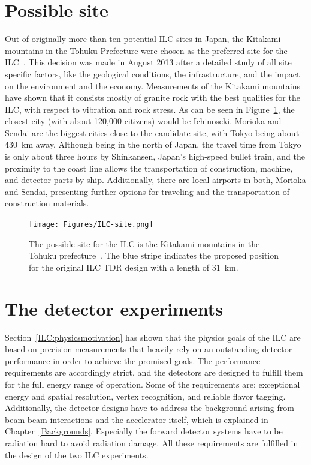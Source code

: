 \section{Possible site}
Out of originally more than ten potential ILC sites in Japan, the Kitakami mountains in the Tohuku Prefecture were chosen as the preferred site for the ILC~\cite{Site}.
This decision was made in August 2013 after a detailed study of all site specific factors, like the geological conditions, the infrastructure, and the impact on the environment and the economy.
Measurements of the Kitakami mountains have shown that it consists mostly of granite rock with the best qualities for the ILC, with respect to vibration and rock stress.
As can be seen in Figure~\ref{fig:ILC_Site}, the closest city (with about 120,000 citizens) would be Ichinoseki.
Morioka and Sendai are the biggest cities close to the candidate site, with Tokyo being about \SI{430}{\kilo\meter} away.
Although being in the north of Japan, the travel time from Tokyo is only about three hours by Shinkansen, Japan's high-speed bullet train, and the proximity to the coast line allows the transportation of construction, machine, and detector parts by ship.
Additionally, there are local airports in both, Morioka and Sendai, presenting further options for traveling and the transportation of construction materials.
\label{ILC:site}
\begin{figure}[h]
\centering
\texttt{[image: Figures/ILC-site.png]}
\caption[Possible site for the ILC]{The possible site for the ILC is the Kitakami mountains in the Tohuku prefecture~\cite{Kitakami}.
The blue stripe indicates the proposed position for the original ILC TDR design with a length of \SI{31}{\kilo\meter}.}
\label{fig:ILC_Site}
\end{figure}


\section{The detector experiments}
\label{ILC:detectors}
Section~\ref{ILC:physicsmotivation} has shown that the physics goals of the ILC are based on precision measurements that heavily rely on an outstanding detector performance in order to achieve the promised goals.
The performance requirements are accordingly strict, and the detectors are designed to fulfill them for the full energy range of operation.
Some of the requirements are: exceptional energy and spatial resolution, vertex recognition, and reliable flavor tagging.
Additionally, the detector designs have to address the background arising from beam-beam interactions and the accelerator itself, which is explained in Chapter~\ref{Backgrounds}.
Especially the forward detector systems have to be radiation hard to avoid radiation damage.
All these requirements are fulfilled in the design of the two ILC experiments.

